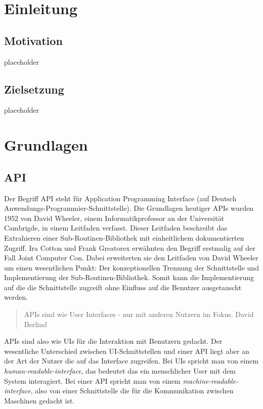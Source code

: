 \documentclass[bachelor, german ]{hgbthesis}
\begin{document}
\tableofcontents
\chapter{Einleitung}

\section{Motivation}
placeholder
\pagebreak

\section{Zielsetzung}
placeholder
\pagebreak

\chapter{Grundlagen}
\section{API}

Der Begriff API steht für Application Programming Interface (auf Deutsch Anwendungs-Programmier-Schnittstelle).
Die Grundlagen heutiger APIs wurden 1952 von David Wheeler, einem Informatikprofessor an der Universität Cambrigde, in einem Leitfaden verfasst.
Dieser Leitfaden beschreibt das Extrahieren einer Sub-Routinen-Bibliothek mit einheitlichem dokumentierten Zugriff. \cite{wheeler1952use}
Ira Cotton und Frank Greatorex erwähnten den Begriff erstmalig auf der Fall Joint Computer Con.\cite{cotton1968data}
Dabei erweiterten sie den Leitfaden von David Wheeler um einen wesentlichen Punkt: Der konzeptionellen Trennung der Schnittstelle und Implementierung der Sub-Routinen-Bibliothek.
Somit kann die Implementierung auf die die Schnittstelle zugreift ohne Einfluss auf die Benutzer ausgetauscht werden.\cite{kress2020graphql}

\begin{quote}
APIs sind wie User Interfaces - nur mit anderen Nutzern im Fokus. David Berlind \cite{berlind2017apis}
\end{quote}

APIs sind also wie UIs für die Interaktion mit Benutzern gedacht.
Der wesentliche Unterschied zwischen UI-Schnittstellen und einer API liegt aber an der Art der Nutzer die auf das Interface zugreifen.
Bei UIs spricht man von einem \textit{human-readable-interface}, das bedeutet das ein menschlicher User mit dem System interagiert.
Bei einer API spricht man von einem \textit{machine-readable-interface}, also von einer Schnittstelle die für die Kommunikation zwischen Maschinen gedacht ist.
\end{document}
